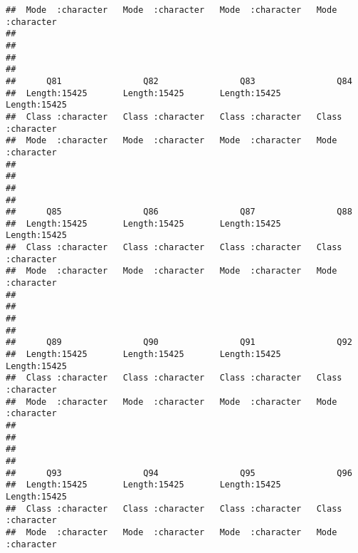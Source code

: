 \documentclass[
]{article}
\begin{document}
\begin{verbatim}
##  Mode  :character   Mode  :character   Mode  :character   Mode  :character  
##                                                                             
##                                                                             
##                                                                             
##                                                                             
##      Q81                Q82                Q83                Q84           
##  Length:15425       Length:15425       Length:15425       Length:15425      
##  Class :character   Class :character   Class :character   Class :character  
##  Mode  :character   Mode  :character   Mode  :character   Mode  :character  
##                                                                             
##                                                                             
##                                                                             
##                                                                             
##      Q85                Q86                Q87                Q88           
##  Length:15425       Length:15425       Length:15425       Length:15425      
##  Class :character   Class :character   Class :character   Class :character  
##  Mode  :character   Mode  :character   Mode  :character   Mode  :character  
##                                                                             
##                                                                             
##                                                                             
##                                                                             
##      Q89                Q90                Q91                Q92           
##  Length:15425       Length:15425       Length:15425       Length:15425      
##  Class :character   Class :character   Class :character   Class :character  
##  Mode  :character   Mode  :character   Mode  :character   Mode  :character  
##                                                                             
##                                                                             
##                                                                             
##                                                                             
##      Q93                Q94                Q95                Q96           
##  Length:15425       Length:15425       Length:15425       Length:15425      
##  Class :character   Class :character   Class :character   Class :character  
##  Mode  :character   Mode  :character   Mode  :character   Mode  :character  

\end{verbatim}
\end{document}
